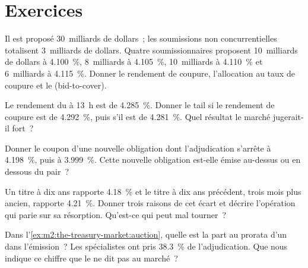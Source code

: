 \section{Exercices}

\begin{exercise}[$\star$]\label{exo:m2:the-treasury-market:1}
Il est proposé 30~milliards de dollars~; les soumissions non concurrentielles totalisent 3~milliards de dollars. Quatre soumissionnaires
proposent 10~milliards de dollars à 4.100~\%, 8~milliards à 4.105~\%, 10~milliards à 4.110~\% et
6~milliards à 4.115~\%. Donner le rendement de coupure, l'allocation au taux de coupure et le
 (bid-to-cover).
\end{exercise}

\begin{exercise}[$\star$]\label{exo:m2:the-treasury-market:2}
Le rendement du  à 13~h est de 4.285~\%. Donner le tail si le rendement de coupure est
de 4.292~\%, puis s'il est de 4.281~\%. Quel résultat le marché jugerait-il fort~?
\end{exercise}

\begin{exercise}[$\star$]\label{exo:m2:the-treasury-market:3}
Donner le coupon d'une nouvelle obligation dont l'adjudication s'arrête à 4.198~\%, puis à 3.999~\%.
Cette nouvelle obligation est-elle émise au-dessus ou en dessous du pair~?
\end{exercise}

\begin{exercise}[$\star\star$]\label{exo:m2:the-treasury-market:4}
Un titre à dix ans  rapporte 4.18~\% et le titre à dix ans précédent, trois mois
plus ancien, rapporte 4.21~\%. Donner trois raisons de cet écart et décrire l'opération qui
parie sur sa résorption. Qu'est-ce qui peut mal tourner~?
\end{exercise}

\begin{exercise}[$\star\star$]\label{exo:m2:the-treasury-market:5}
Dans l'\cref{ex:m2:the-treasury-market:auction}, quelle est la part au prorata d'un
 dans l'émission~? Les spécialistes ont pris 38.3~\% de
l'adjudication. Que nous indique ce chiffre que le  ne dit pas au marché~?
\end{exercise}

